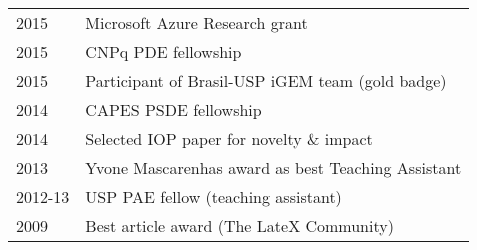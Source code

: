 \documentclass[letterpaper]{resume} %
\begin{document}
\begin{minipage}[t]{0.64\textwidth}
  \begin{tabular}{ll}
  2015   & Microsoft Azure Research grant\\
  2015   & CNPq PDE fellowship\\
  2015   & Participant of Brasil-USP iGEM team (gold badge) \\
  2014   & CAPES PSDE fellowship\\
  2014   & Selected IOP paper for novelty \& impact\\
  2013   & Yvone Mascarenhas award as best Teaching Assistant \\
  2012-13 & USP PAE fellow (teaching assistant) \\
  2009   & Best article award (The LateX Community)
  \end{tabular}

  \sectionspace %


  \sectionspace %

\end{minipage} %
\end{document}
